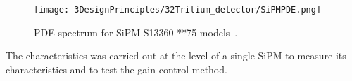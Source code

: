 \begin{figure}[htbp]
\centering
\texttt{[image: 3DesignPrinciples/32Tritium\_detector/SiPMPDE.png]}
\caption{PDE spectrum for SiPM S13360-**75 models~\cite{DataSheetHammamatsu_1_SiPM_1375}.\label{fig:PDESiPM}}
\end{figure}
The characteristics was carried out at the level of a single SiPM to measure its characteristics and to test the gain control method. %
